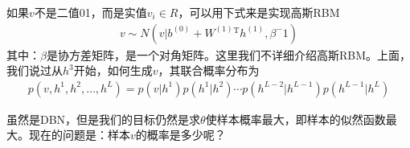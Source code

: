         \par
        如果$v$不是二值01，而是实值$v_i\in R$，可以用下式来是实现高斯RBM
        \begin{align*}
        v\sim N(v|b^{(0)}+ W^{(1)}{}^\mathrm{T}h^{(1)} ,\beta^-1)
        \end{align*}
        其中：$\beta$是协方差矩阵，是一个对角矩阵。这里我们不详细介绍高斯RBM。上面，我们说过从$h^3$开始，如何生成$v$，其联合概率分布为
        \begin{align*}
        p(v,h^1,h^2,\dots,h^L) = p(v|h^1)p(h^1|h^2)\cdots p(h^{L-2}|h^{L-1})p(h^{L-1}|h^{L})
        \end{align*}
        \par
        虽然是DBN，但是我们的目标仍然是求$\theta$使样本概率最大，即样本的似然函数最大。现在的问题是：样本$v$的概率是多少呢？

